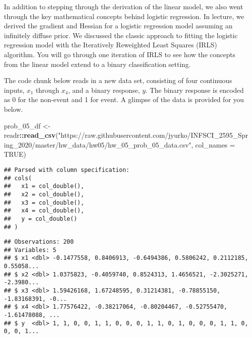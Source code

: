 \documentclass[
]{article}
\newenvironment{Shaded}{\begin{snugshade}}{\end{snugshade}}
\newcommand{\DataTypeTok}[1]{\textcolor[rgb]{0.13,0.29,0.53}{#1}}
\newcommand{\DecValTok}[1]{\textcolor[rgb]{0.00,0.00,0.81}{#1}}
\newcommand{\KeywordTok}[1]{\textcolor[rgb]{0.13,0.29,0.53}{\textbf{#1}}}
\newcommand{\NormalTok}[1]{#1}
\newcommand{\OperatorTok}[1]{\textcolor[rgb]{0.81,0.36,0.00}{\textbf{#1}}}
\newcommand{\OtherTok}[1]{\textcolor[rgb]{0.56,0.35,0.01}{#1}}
\newcommand{\StringTok}[1]{\textcolor[rgb]{0.31,0.60,0.02}{#1}}
\begin{document}
In addition to stepping through the derivation of the linear model, we
also went through the key mathematical concepts behind logistic
regression. In lecture, we derived the gradient and Hessian for a
logistic regression model assuming an infinitely diffuse prior. We
discussed the classic approach to fitting the logistic regression model
with the Iteratively Reweighted Least Squares (IRLS) algorithm. You will
go through one iteration of IRLS to see how the concepts from the linear
model extend to a binary classification setting.

The code chunk below reads in a new data set, consisting of four
continuous inputs, \(x_1\) through \(x_4\), and a binary response,
\(y\). The binary response is encoded as 0 for the non-event and 1 for
event. A glimpse of the data is provided for you below.

\begin{Shaded}
\begin{Highlighting}[]
\NormalTok{prob_}\DecValTok{05}\NormalTok{_df <-}\StringTok{ }\NormalTok{readr}\OperatorTok{::}\KeywordTok{read_csv}\NormalTok{(}\StringTok{"https://raw.githubusercontent.com/jyurko/INFSCI_2595_Spring_2020/master/hw_data/hw05/hw_05_prob_05_data.csv"}\NormalTok{, }\DataTypeTok{col_names =} \OtherTok{TRUE}\NormalTok{)}
\end{Highlighting}
\end{Shaded}

\begin{verbatim}
## Parsed with column specification:
## cols(
##   x1 = col_double(),
##   x2 = col_double(),
##   x3 = col_double(),
##   x4 = col_double(),
##   y = col_double()
## )
\end{verbatim}

\begin{Shaded}
\end{Shaded}

\begin{verbatim}
## Observations: 200
## Variables: 5
## $ x1 <dbl> -0.1477558, 0.8406913, -0.6494386, 0.5806242, 0.2112185, 0.55058...
## $ x2 <dbl> 1.0375823, -0.4059740, 0.8524313, 1.4656521, -2.3025271, -2.3980...
## $ x3 <dbl> 1.59426168, 1.67248595, 0.31214381, -0.78855150, -1.83168391, -0...
## $ x4 <dbl> 1.77576422, -0.38217064, -0.80204467, -0.52755470, -1.61478088, ...
## $ y  <dbl> 1, 1, 0, 0, 1, 1, 0, 0, 0, 1, 1, 0, 1, 0, 0, 0, 1, 1, 0, 0, 0, 1...
\end{verbatim}
\end{document}
